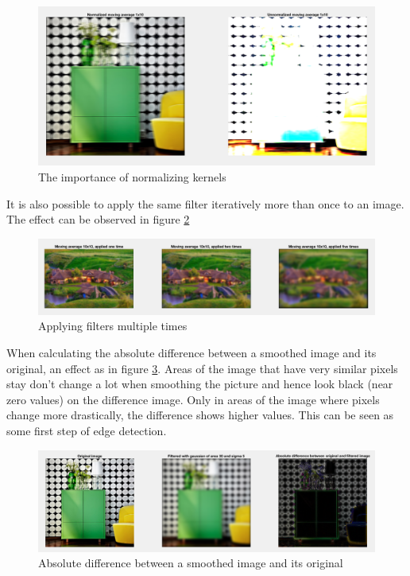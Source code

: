 \documentclass[11pt]{article}
\begin{document}
\begin{figure}[!hbt]
  \includegraphics[width=\textwidth]{task15}
  \caption{The importance of normalizing kernels}
  \label{fig:task15}
\end{figure}

It is also possible to apply the same filter iteratively more than once to an image. The effect can be observed in figure \ref{fig:task16}

\begin{figure}[!hbt]
  \includegraphics[width=\textwidth]{task16}
  \caption{Applying filters multiple times}
  \label{fig:task16}
\end{figure}

When calculating the absolute difference between a smoothed image and its original, an effect as in figure \ref{fig:task17}. Areas of the image that have very similar pixels stay don't change a lot when smoothing the picture and hence look black (near zero values) on the difference image. Only in areas of the image where pixels change more drastically, the difference shows higher values. This can be seen as some first step of edge detection.

\begin{figure}[!hbt]
  \includegraphics[width=\textwidth]{task17}
  \caption{Absolute difference between a smoothed image and its original}
  \label{fig:task17}
\end{figure}
\end{document}
